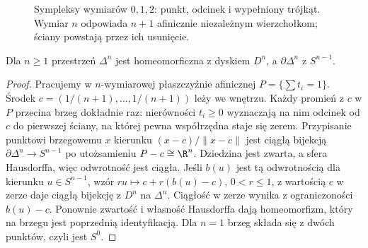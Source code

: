 \begin{figure}[!htbp]
\centering
{}
\caption{Sympleksy wymiarów $0,1,2$: punkt,
odcinek i wypełniony trójkąt. Wymiar
$n$ odpowiada $n+1$ afinicznie niezależnym
wierzchołkom; ściany powstają przez ich usunięcie.}
\label{fig:sympleks-trojkat}
\end{figure}

\begin{stwierdzenie}
\label{prop:brzeg-sympleksu}
Dla $n\geq1$ przestrzeń $\Delta^n$
jest homeomorficzna z dyskiem $D^n$,
a $\partial\Delta^n$ z $S^{n-1}$.
\end{stwierdzenie}
\begin{proof}
Pracujemy w $n$-wymiarowej płaszczyźnie
afinicznej $P=\{\sum t_i=1\}$.
Środek $c=(1/(n+1),\ldots,1/(n+1))$
leży we wnętrzu. Każdy promień z $c$
w $P$ przecina brzeg dokładnie raz:
nierówności $t_i\geq0$ wyznaczają
na nim odcinek od $c$ do pierwszej
ściany, na której pewna współrzędna
staje się zerem.
Przypisanie punktowi brzegowemu
$x$ kierunku $(x-c)/\|x-c\|$
jest ciągłą bijekcją
$\partial\Delta^n\to S^{n-1}$
po utożsamieniu $P-c\cong\R^n$.
Dziedzina jest zwarta, a sfera
Hausdorffa, więc odwrotność jest
ciągła. Jeśli $b(u)$ jest tą odwrotnością dla kierunku
$u\in S^{n-1}$, wzór $ru\mapsto c+r(b(u)-c)$, $0<r\leq1$,
z wartością $c$ w zerze daje ciągłą bijekcję z $D^n$ na $\Delta^n$.
Ciągłość w zerze wynika z ograniczoności $b(u)-c$.
Ponownie zwartość i własność Hausdorffa dają homeomorfizm,
który na brzegu jest poprzednią identyfikacją. Dla $n=1$ brzeg
składa się z dwóch punktów,
czyli jest $S^0$.
\end{proof}

